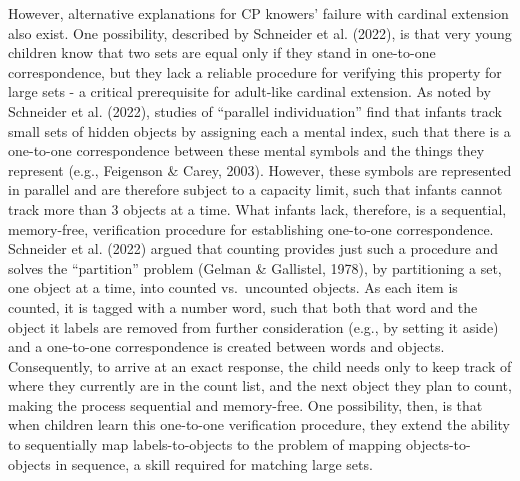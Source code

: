 \documentclass[
  man,floatsintext]{apa7}
\begin{document}
However, alternative explanations for CP knowers' failure with cardinal extension also exist. One possibility, described by Schneider et al. (2022), is that very young children know that two sets are equal only if they stand in one-to-one correspondence, but they lack a reliable procedure for verifying this property for large sets - a critical prerequisite for adult-like cardinal extension. As noted by Schneider et al. (2022), studies of ``parallel individuation'' find that infants track small sets of hidden objects by assigning each a mental index, such that there is a one-to-one correspondence between these mental symbols and the things they represent (e.g., Feigenson \& Carey, 2003). However, these symbols are represented in parallel and are therefore subject to a capacity limit, such that infants cannot track more than 3 objects at a time. What infants lack, therefore, is a sequential, memory-free, verification procedure for establishing one-to-one correspondence. Schneider et al. (2022) argued that counting provides just such a procedure and solves the ``partition'' problem (Gelman \& Gallistel, 1978), by partitioning a set, one object at a time, into counted vs.~uncounted objects. As each item is counted, it is tagged with a number word, such that both that word and the object it labels are removed from further consideration (e.g., by setting it aside) and a one-to-one correspondence is created between words and objects. Consequently, to arrive at an exact response, the child needs only to keep track of where they currently are in the count list, and the next object they plan to count, making the process sequential and memory-free. One possibility, then, is that when children learn this one-to-one verification procedure, they extend the ability to sequentially map labels-to-objects to the problem of mapping objects-to-objects in sequence, a skill required for matching large sets.
\end{document}
